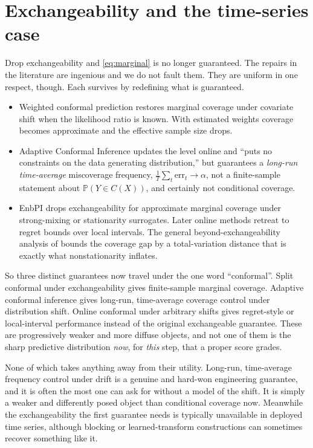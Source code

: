 \documentclass[11pt]{article}
\theoremstyle{definition}
\renewcommand{\Pr}{\mathbb{P}}
\begin{document}
\section{Exchangeability and the time-series case}\label{sec:exch}

Drop exchangeability and \eqref{eq:marginal} is no longer guaranteed. The repairs in the
literature are ingenious and we do not fault them. They are uniform in one respect, though.
Each survives by redefining what is guaranteed.
\begin{itemize}
  \item Weighted conformal prediction \citep{tibshirani2019conformal} restores
  marginal coverage under covariate shift when the likelihood ratio is known. With
  estimated weights coverage becomes approximate and the effective sample size drops.
  \item Adaptive Conformal Inference \citep{gibbs2021adaptive} updates the level
  online and ``puts no constraints on the data generating distribution,'' but guarantees
  a \emph{long-run time-average} miscoverage frequency,
  $\frac1T\sum_t \mathrm{err}_t\to\alpha$, not a finite-sample statement about
  $\Pr(Y\in C(X))$, and certainly not conditional coverage.
  \item EnbPI \citep{xu2021conformal} drops exchangeability for approximate
  marginal coverage under strong-mixing or stationarity surrogates. Later online methods
  \citep{zaffran2022adaptive,gibbs2024conformal} retreat to regret bounds over local
  intervals. The general beyond-exchangeability analysis of \citet{barber2023conformal}
  bounds the coverage gap by a total-variation distance that is exactly what
  nonstationarity inflates.
\end{itemize}
So three distinct guarantees now travel under the one word ``conformal''.
Split conformal under exchangeability gives finite-sample marginal coverage. Adaptive
conformal inference gives long-run, time-average coverage control under distribution shift.
Online conformal under arbitrary shifts gives regret-style or local-interval performance
instead of the original exchangeable guarantee. These are progressively weaker and more
diffuse objects, and not one of them is the sharp predictive distribution \emph{now}, for
\emph{this} step, that a proper score grades.

None of which takes anything away from their utility. Long-run, time-average frequency
control under drift is a genuine and hard-won engineering guarantee, and it is often the
most one can ask for without a model of the shift. It is simply a weaker and differently
posed object than conditional coverage now. Meanwhile the exchangeability the first
guarantee needs is typically unavailable in deployed time series, although blocking or
learned-transform constructions can sometimes recover something like it.
\end{document}
